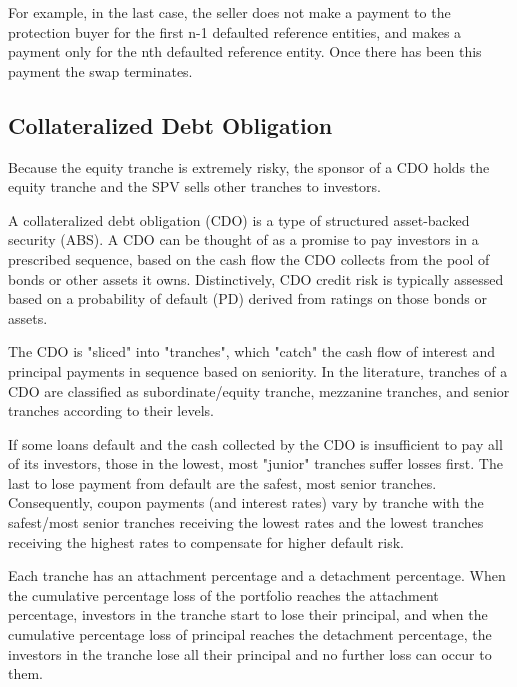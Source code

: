 For example, in the last case, the
seller does not make a payment to the protection buyer for
the first n-1 defaulted reference entities, and makes a payment only for the
nth defaulted reference entity. Once there has been this payment the swap terminates.

\subsection{Collateralized Debt Obligation}\label{collateralized-debt-obligation}








 Because the equity tranche is
extremely risky, the sponsor of a CDO holds the equity tranche and the
SPV sells other tranches to investors.



A collateralized debt obligation (CDO) is a type of structured asset-backed security (ABS). 
A CDO can be thought of as a promise to pay investors in a prescribed sequence, based on the cash flow the CDO collects from the pool of bonds or other assets it owns. Distinctively, CDO credit risk is typically assessed based on a probability of default (PD) derived from ratings on those bonds or assets.

The CDO is "sliced" into "tranches", which "catch" the cash flow of interest and principal payments in sequence based on seniority.
In the literature, tranches of a CDO are classified as
subordinate/equity tranche, mezzanine tranches, and senior tranches
according to their levels.

If some loans default and the cash collected by the CDO is insufficient to pay all of its investors, those in the lowest, most "junior" tranches suffer losses first. The last to lose payment from default are the safest, most senior tranches. Consequently, coupon payments (and interest rates) vary by tranche with the safest/most senior tranches receiving the lowest rates and the lowest tranches receiving the highest rates to compensate for higher default risk.

Each tranche has an attachment percentage and a detachment
percentage. When the cumulative percentage loss of the portfolio reaches
the attachment percentage, investors in the tranche start to lose their
principal, and when the cumulative percentage loss of principal reaches
the detachment percentage, the investors in the tranche lose all their
principal and no further loss can occur to them.

